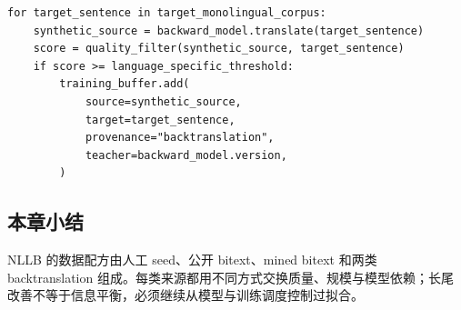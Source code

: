 \begin{lstlisting}[caption={带 provenance 与质量控制的 backtranslation 概念流程}]
for target_sentence in target_monolingual_corpus:
    synthetic_source = backward_model.translate(target_sentence)
    score = quality_filter(synthetic_source, target_sentence)
    if score >= language_specific_threshold:
        training_buffer.add(
            source=synthetic_source,
            target=target_sentence,
            provenance="backtranslation",
            teacher=backward_model.version,
        )
\end{lstlisting}


\subsection{本章小结}

NLLB 的数据配方由人工 seed、公开 bitext、mined bitext 和两类 backtranslation 组成。每类来源都用不同方式交换质量、规模与模型依赖；长尾改善不等于信息平衡，必须继续从模型与训练调度控制过拟合。

